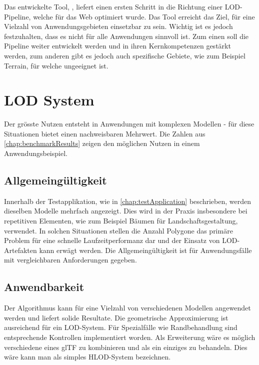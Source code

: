 Das entwickelte Tool, , liefert einen ersten Schritt in die Richtung einer LOD-Pipeline, welche für das Web optimiert wurde. Das Tool erreicht das Ziel, für eine Vielzahl von Anwendungsgebieten einsetzbar zu sein. Wichtig ist es jedoch festzuhalten, dass es nicht für alle Anwendungen sinnvoll ist. Zum einen soll die Pipeline weiter entwickelt werden und in ihren Kernkompetenzen gestärkt werden, zum anderen gibt es jedoch auch spezifische Gebiete, wie zum Beispiel Terrain, für welche  ungeeignet ist.

\section{LOD System}

Der grösste Nutzen entsteht in Anwendungen mit komplexen Modellen - für diese Situationen bietet  einen nachweisbaren Mehrwert. Die Zahlen aus \autoref{chap:benchmarkResults} zeigen den möglichen Nutzen in einem Anwendungsbeispiel.

\subsection{Allgemeingültigkeit}

Innerhalb der Testapplikation, wie in \autoref{chap:testApplication} beschrieben, werden dieselben Modelle mehrfach angezeigt. Dies wird in der Praxis insbesondere bei repetitiven Elementen, wie zum Beispiel Bäumen für Landschaftsgestaltung, verwendet. In solchen Situationen stellen die Anzahl Polygone das primäre Problem für eine schnelle Laufzeitperformanz dar und der Einsatz von LOD-Artefakten kann erwägt werden. Die Allgemeingültigkeit ist für Anwendungsfälle mit vergleichbaren Anforderungen gegeben.

\subsection{Anwendbarkeit}

Der Algorithmus kann für eine Vielzahl von verschiedenen Modellen angewendet werden und liefert solide Resultate. Die geometrische Approximierung ist ausreichend für ein LOD-System. Für Spezialfälle wie Randbehandlung sind entsprechende Kontrollen implementiert worden. Als Erweiterung wäre es möglich verschiedene  eines glTF zu kombinieren und als ein einziges  zu behandeln. Dies wäre kann man als simples HLOD-System bezeichnen.

